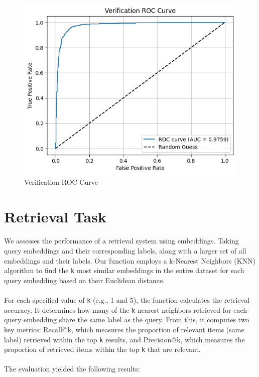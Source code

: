 \documentclass{CUP-JNL-DTM}
\theoremstyle{definition}
\numberwithin{equation}{section}
\begin{document}
\begin{figure}[ht]
    \centering
    \includegraphics[width=0.6\linewidth]{roccurve.png}
    \caption{Verification ROC Curve}
    \label{fig:enter-label}
\end{figure}

\section{Retrieval Task}

\paragraph{}We assesses the performance of a retrieval system using embeddings. Taking query embeddings and their corresponding labels, along with a larger set of all embeddings and their labels. Our function employs a k-Nearest Neighbors (KNN) algorithm to find the \verb|k| most similar embeddings in the entire dataset for each query embedding based on their Euclidean distance.

\paragraph{}For each specified value of \verb|k| (e.g., 1 and 5), the function calculates the retrieval accuracy. It determines how many of the \verb|k| nearest neighbors retrieved for each query embedding share the same label as the query. From this, it computes two key metrics: Recall@k, which measures the proportion of relevant items (same label) retrieved within the top \verb|k| results, and Precision@k, which measures the proportion of retrieved items within the top \verb|k| that are relevant.

\paragraph{}The evaluation yielded the following results:
\end{document}
